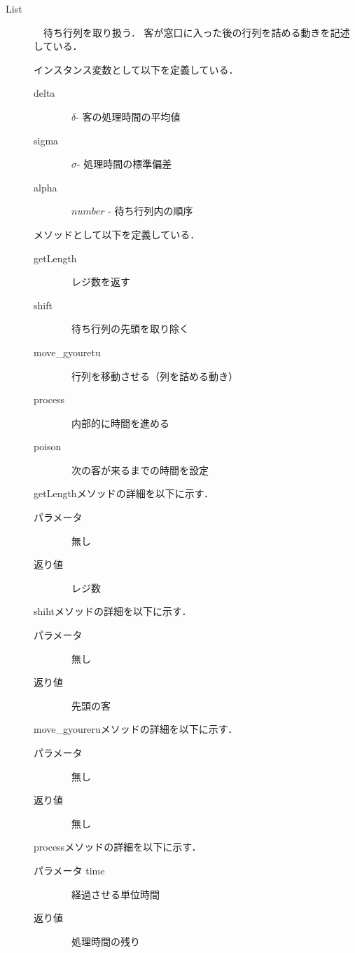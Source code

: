 \documentclass[12pt,a4j]{ltjsarticle}
\begin{document}
\begin{description}
\item[List]　待ち行列を取り扱う．
客が窓口に入った後の行列を詰める動きを記述している． 

インスタンス変数として以下を定義している．
\begin{description}
	\item[delta]　$\delta$- 客の処理時間の平均値
	\item[sigma]　$\sigma$- 処理時間の標準偏差
	\item[alpha]　$number$  - 待ち行列内の順序
\end{description}
\vspace{5mm}

メソッドとして以下を定義している．
\begin{description}
	\item[getLength]　レジ数を返す
	\item[shift]　待ち行列の先頭を取り除く
	\item[move\_gyouretu]　行列を移動させる（列を詰める動き）
	\item[process]　内部的に時間を進める
	\item[poison]　次の客が来るまでの時間を設定
\end{description}
\vspace{5mm}

getLengthメソッドの詳細を以下に示す．
\begin{description}
	\item[パラメータ]　無し
	\item[返り値]　レジ数
\end{description}
\vspace{5mm}

shihtメソッドの詳細を以下に示す．
\begin{description}
	\item[パラメータ]　無し
	\item[返り値]　先頭の客
\end{description}
\vspace{5mm}

move\_gyoureruメソッドの詳細を以下に示す．
\begin{description}
	\item[パラメータ]　無し
	\item[返り値]　無し
\end{description}
\vspace{5mm}

processメソッドの詳細を以下に示す．
\begin{description}
	\item[パラメータ time]　経過させる単位時間
	\item[返り値]　処理時間の残り
\end{description}
\vspace{5mm}


\end{description}
\end{document}
